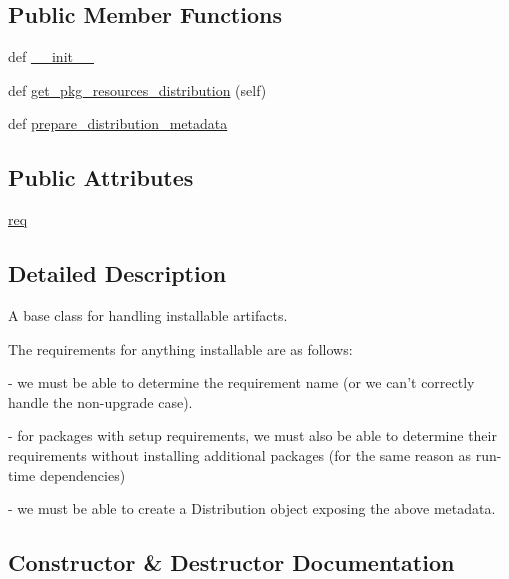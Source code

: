 \subsection*{Public Member Functions}
\begin{DoxyCompactItemize}
\item 
def \hyperlink{classpip_1_1__internal_1_1distributions_1_1base_1_1AbstractDistribution_a79ff978845d5e7f5e6df9e46ab0afd77}{\+\_\+\+\_\+init\+\_\+\+\_\+}
\item 
def \hyperlink{classpip_1_1__internal_1_1distributions_1_1base_1_1AbstractDistribution_a4f5e44d5d087f72ea3633a0e6fb0615f}{get\+\_\+pkg\+\_\+resources\+\_\+distribution} (self)
\item 
def \hyperlink{classpip_1_1__internal_1_1distributions_1_1base_1_1AbstractDistribution_a1aa25d967011f992a34601c7ef5f1d04}{prepare\+\_\+distribution\+\_\+metadata}
\end{DoxyCompactItemize}
\subsection*{Public Attributes}
\begin{DoxyCompactItemize}
\item 
\hyperlink{classpip_1_1__internal_1_1distributions_1_1base_1_1AbstractDistribution_a4e0f5834a91b4f3ab6be563959652df9}{req}
\end{DoxyCompactItemize}


\subsection{Detailed Description}
\begin{DoxyVerb}A base class for handling installable artifacts.

The requirements for anything installable are as follows:

 - we must be able to determine the requirement name
   (or we can't correctly handle the non-upgrade case).

 - for packages with setup requirements, we must also be able
   to determine their requirements without installing additional
   packages (for the same reason as run-time dependencies)

 - we must be able to create a Distribution object exposing the
   above metadata.
\end{DoxyVerb}
 

\subsection{Constructor \& Destructor Documentation}
\mbox{\label{classpip_1_1__internal_1_1distributions_1_1base_1_1AbstractDistribution_a79ff978845d5e7f5e6df9e46ab0afd77}} 
